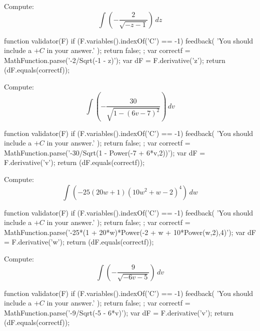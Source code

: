 \documentclass{ximera}
\renewcommand{\d}{\, d}
\begin{document}
\begin{exercise}
Compute: 
\[
\int \left(-\frac{2}{\sqrt{-z-1}}\right)\d z
\]
\begin{expressionAnswer}
     function validator(F) {
      if (F.variables().indexOf('C') == -1) {
        feedback( 'You should include a $+C$ in your answer.' );
        return false;
      };      
      var correctf = MathFunction.parse('-2/Sqrt(-1 - z)');
      var dF = F.derivative('z');
      return (dF.equals(correctf));
    }
\end{expressionAnswer}
\end{exercise}



\begin{exercise}
Compute: 
\[
\int \left(-\frac{30}{\sqrt{1-(6 v-7)^2}}\right)\d v
\]
\begin{expressionAnswer}
     function validator(F) {
      if (F.variables().indexOf('C') == -1) {
        feedback( 'You should include a $+C$ in your answer.' );
        return false;
      };      
      var correctf = MathFunction.parse('-30/Sqrt(1 - Power(-7 + 6*v,2))');
      var dF = F.derivative('v');
      return (dF.equals(correctf));
    }
\end{expressionAnswer}
\end{exercise}



\begin{exercise}
Compute: 
\[
\int \left(-25 (20 w+1) \left(10 w^2+w-2\right)^4\right)\d w
\]
\begin{expressionAnswer}
     function validator(F) {
      if (F.variables().indexOf('C') == -1) {
        feedback( 'You should include a $+C$ in your answer.' );
        return false;
      };      
      var correctf = MathFunction.parse('-25*(1 + 20*w)*Power(-2 + w + 10*Power(w,2),4)');
      var dF = F.derivative('w');
      return (dF.equals(correctf));
    }
\end{expressionAnswer}
\end{exercise}



\begin{exercise}
Compute: 
\[
\int \left(-\frac{9}{\sqrt{-6 v-5}}\right)\d v
\]
\begin{expressionAnswer}
     function validator(F) {
      if (F.variables().indexOf('C') == -1) {
        feedback( 'You should include a $+C$ in your answer.' );
        return false;
      };      
      var correctf = MathFunction.parse('-9/Sqrt(-5 - 6*v)');
      var dF = F.derivative('v');
      return (dF.equals(correctf));
    }
\end{expressionAnswer}
\end{exercise}
\end{document}
